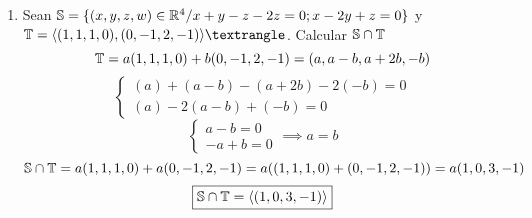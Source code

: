 \documentclass[../practica.root.tex]{subfiles}
\begin{document}
\begin{enumerate}
    \item Sean $\mathbb{S} = \{(x,y,z,w) \in \mathbb{R}^4 / x + y - z - 2z = 0; x - 2y + z = 0\}$ y $\T = \langle(1,1,1,0),(0,-1,2,-1)\rangle⟩$. Calcular $\mathbb{S} \cap \mathbb{T}$ %
          \[
              \mathbb{T} = a(1,1,1,0) + b(0,-1,2,-1) = (a, a-b, a+2b, -b)
          \] \[
              \begin{cases}
                  (a) + (a-b) - (a+2b) - 2(-b) = 0 \\
                  (a) - 2(a-b) + (-b) = 0
              \end{cases}
          \] \[
              \begin{cases}
                  a - b = 0 \\
                  -a + b = 0
              \end{cases}
              \implies
              a = b
          \] \[
              \mathbb{S}\cap\mathbb{T} = a(1,1,1,0) + a(0,-1,2,-1) = a((1,1,1,0) + (0,-1,2,-1)) = a(1,0,3,-1)
          \] \[
              \boxed{\mathbb{S}\cap\mathbb{T} = \langle(1,0,3,-1)\rangle}
          \]


\end{enumerate}
\end{document}
